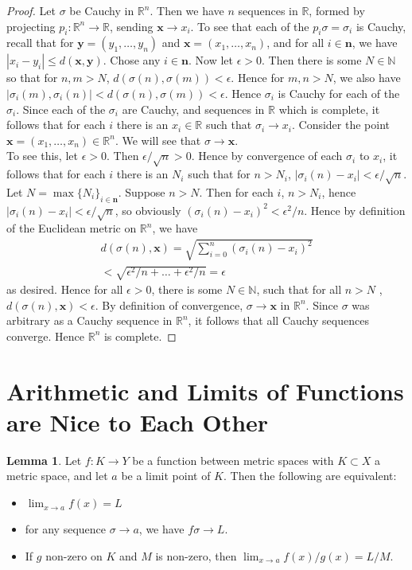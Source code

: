 \documentclass[11pt]{article}
\newcommand{\R}{\mathbb{R}}
\newcommand{\N}{\mathbb{N}}
\theoremstyle{definition}
\newtheorem{lemma}{Lemma}
\begin{document}
\begin{proof}
Let $\sigma$ be Cauchy in $\R^n$. Then we have $n$ sequences in $\R$, formed by projecting $p_i:\R^n \to \R$, sending $\mathbf{x}\to x_i$. To see that each of the $p_i\sigma = \sigma_i$ is Cauchy, recall that for $\mathbf{y} = (y_1,\dots, y_n)$ and $\mathbf{x} = (x_1,\dots, x_n)$, and for all $i\in \mathbf{n}$, we have $|x_i - y_i| \le d(\mathbf{x}, \mathbf{y})$. Chose any $i\in \mathbf{n}$. Now let $\epsilon > 0$. Then there is some $N\in \N$ so that for $n,m>N$, $d(\sigma(n), \sigma(m)) < \epsilon$. Hence for $m,n > N$, we also have $ |\sigma_i(m), \sigma_i(n) | < d(\sigma(n), \sigma(m)) < \epsilon $. Hence $\sigma_i$ is Cauchy for each of the $\sigma_i$. Since each of the $\sigma_i$ are Cauchy, and sequences in $\R$ which is complete, it follows that for each $i$ there is an $x_i\in \R$ such that $\sigma_i \to x_i$. Consider the point $\mathbf{x} = (x_1, \dots, x_n)\in \R^n$. We will see that $\sigma\to \mathbf{x}$.\\

To see this, let $\epsilon > 0$. Then $\epsilon/\sqrt{n} > 0$. Hence by convergence of each $\sigma_i$ to $x_i$, it follows that for each $i$ there is an $N_i$ such that for $n> N_i$, $|\sigma_i(n) - x_i| < \epsilon/\sqrt{n}$. Let $N = \max\{N_i\}_{i\in \mathbf{n}}$. Suppose $n> N$. Then for each $i$, $n > N_i$, hence $|\sigma_i (n) - x_i| < \epsilon/\sqrt{n}$, so obviously $(\sigma_i (n) - x_i)^2 < \epsilon^2/n$. Hence by definition of the Euclidean metric on $\R^n$, we have
\[
\begin{array}{c}
d(\sigma(n) , \mathbf{x} ) = \sqrt{\sum_{i = 0}^n(\sigma_i ( n) - x_i)^2 } \\

< \sqrt{\epsilon^2/n + \dots + \epsilon^2/n} = \epsilon
\end{array}
\]
as desired. Hence for all $\epsilon > 0$, there is some $N\in \N$, such that for all $n > N$ , $d(\sigma(n) , \mathbf{x} ) < \epsilon$. By definition of convergence, $\sigma\to \mathbf{x}$ in $\R^n$. Since $\sigma$ was arbitrary as a Cauchy sequence in $\R^n$, it follows that all Cauchy sequences converge. Hence $\R^n$ is complete.
\end{proof}

\section{Arithmetic and Limits of Functions are Nice to Each Other}

\begin{lemma}
Let $f:K\to Y$ be a function between metric spaces with $K\subset X$ a metric space, and let $ a $ be a limit point of $K$. Then the following are equivalent:
\begin{itemize}
\item $ \lim_{x\to a}f(x) = L $
\item for any sequence $ \sigma \to a $, we have $ f\sigma\to L $.
\item If $g$ non-zero on $K$ and $M$ is non-zero, then $\lim_{x\to a} f(x) / g(x) = L/M$.
\end{itemize}  
\end{lemma}
\end{document}

